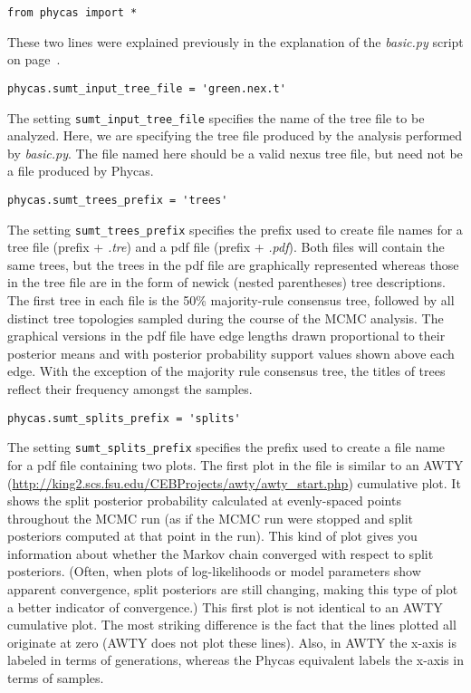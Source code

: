 \documentclass[10pt]{article}
\newcommand{\pathname}[1]{{\em #1}}			%
\newcommand{\opt}[1]{{\tt \small #1}\index{#1}}		%
\begin{document}
\begin{verbatim}
from phycas import *
\end{verbatim}
%
These two lines were explained previously in the explanation of the \pathname{basic.py} script on page~\pageref{subsec:basicpyexplanation}.
%
\begin{verbatim}
phycas.sumt_input_tree_file = 'green.nex.t'
\end{verbatim}
%
The setting \opt{sumt\_input\_tree\_file} specifies the name of the tree file to be analyzed. Here, we are specifying the tree file produced by the analysis performed by \pathname{basic.py}. The file named here should be a valid nexus tree file, but need not be a file produced by Phycas.
%
\begin{verbatim}
phycas.sumt_trees_prefix = 'trees'
\end{verbatim}
%
The setting \opt{sumt\_trees\_prefix} specifies the prefix used to create file names for a tree file (prefix + \pathname{.tre}) and a pdf file (prefix + \pathname{.pdf}). Both files will contain the same trees, but the trees in the pdf file are graphically represented whereas those in the tree file are in the form of newick (nested parentheses) tree descriptions. The first tree in each file is the 50\% majority-rule consensus tree, followed by all distinct tree topologies sampled during the course of the MCMC analysis. The graphical versions in the pdf file have edge lengths drawn proportional to their posterior means and with posterior probability support values shown above each edge. With the exception of the majority rule consensus tree, the titles of trees reflect their frequency amongst the samples. 
%
\begin{verbatim}
phycas.sumt_splits_prefix = 'splits'
\end{verbatim}
%
The setting \opt{sumt\_splits\_prefix} specifies the prefix used to create a file name for a pdf file containing two plots. The first plot in the file is similar to an AWTY (\url{http://king2.scs.fsu.edu/CEBProjects/awty/awty_start.php}) cumulative plot. It shows the split posterior probability calculated at evenly-spaced points throughout the MCMC run (as if the MCMC run were stopped and split posteriors computed at that point in the run). This kind of plot gives you information about whether the Markov chain converged with respect to split posteriors. (Often, when plots of log-likelihoods or model parameters show apparent convergence, split posteriors are still changing, making this type of plot a better indicator of convergence.) This first plot is not identical to an AWTY cumulative plot. The most striking difference is the fact that the lines plotted all originate at zero (AWTY does not plot these lines). Also, in AWTY the x-axis is labeled in terms of generations, whereas the Phycas equivalent labels the x-axis in terms of samples. 
\end{document}
